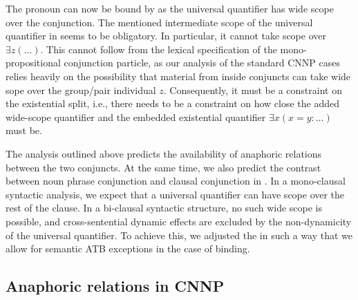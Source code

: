 \documentclass[output=paper]{langsci/langscibook}
\begin{document}
The pronoun  can now be bound by  as the universal quantifier has wide scope over the conjunction. %
%
The mentioned intermediate scope of the universal quantifier in   seems to be obligatory. 
In particular, it cannot take scope over $\exists z (\ldots)$. 
This cannot follow from the lexical specification of the mono-propositional conjunction particle, as our analysis of the standard CNNP cases relies heavily on the possibility that material from inside conjuncts can take wide sope over the group/pair individual $z$. 
Consequently, it must be a constraint on the existential split, i.e., there needs to be a constraint on how close the added wide-scope quantifier and the embedded existential quantifier $\exists x (x=y: \ldots)$ must be. 







\medskip%
The analysis outlined above predicts the availability of anaphoric relations between the two conjuncts. 
At the same time, we also predict the contrast between noun phrase conjunction and clausal conjunction in .
In a mono-clausal syntactic analysis, we expect that a universal quantifier can have scope over the rest of the clause. 
In a bi-clausal syntactic structure, no such wide scope is possible, and cross-sentential dynamic effects are excluded by the non-dynamicity of the universal quantifier.
To achieve this, we 
adjusted the \CCB{} in such a way that we allow for semantic ATB exceptions in the case of binding.



\subsection{Anaphoric relations in CNNP}
\label{Sec-Anaphor-Neg}
\end{document}

